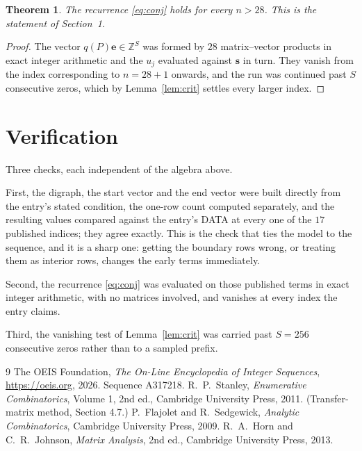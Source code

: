 \documentclass[11pt,a4paper]{article}
\theoremstyle{plain}
\newtheorem{theorem}{Theorem}
\theoremstyle{definition}
\begin{document}
\begin{theorem}
The recurrence \eqref{eq:conj} holds for every $n>28$. This is the statement of
Section~1.
\end{theorem}

\begin{proof}
The vector $q(P)\mathbf{e}\in\mathbb{Z}^{S}$ was formed by $28$ matrix--vector
products in exact integer arithmetic and the $u_j$ evaluated against $\mathbf{s}$ in turn.
They vanish from the index corresponding to $n=28+1$ onwards, and the run was continued
past $S$ consecutive zeros, which by Lemma~\ref{lem:crit} settles every larger index.
\end{proof}

\section{Verification}

Three checks, each independent of the algebra above.

First, the digraph, the start vector and the end vector were built directly from the
entry's stated condition, the one-row count computed separately, and the resulting values
compared against the entry's DATA at every one of the $17$ published indices; they
agree exactly. This is the check that ties the model to the sequence, and it is a sharp one:
getting the boundary rows wrong, or treating them as interior rows, changes the early terms
immediately.

Second, the recurrence \eqref{eq:conj} was evaluated on those published terms in exact
integer arithmetic, with no matrices involved, and vanishes at every index the entry claims.

Third, the vanishing test of Lemma~\ref{lem:crit} was carried past $S=256$ consecutive
zeros rather than to a sampled prefix.

\begin{thebibliography}{9}
 The OEIS Foundation, \emph{The On-Line Encyclopedia of Integer
Sequences}, \url{https://oeis.org}, 2026. Sequence A317218.
 R.~P.~Stanley, \emph{Enumerative Combinatorics}, Volume 1, 2nd ed.,
Cambridge University Press, 2011. (Transfer-matrix method, Section 4.7.)
 P.~Flajolet and R.~Sedgewick, \emph{Analytic Combinatorics}, Cambridge
University Press, 2009.
 R.~A.~Horn and C.~R.~Johnson, \emph{Matrix Analysis}, 2nd ed., Cambridge
University Press, 2013.
\end{thebibliography}
\end{document}
